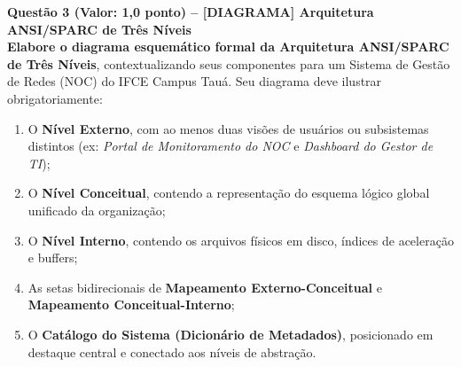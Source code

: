 \documentclass[11pt,a4paper]{article}
\begin{document}
\vspace{0.3cm}
\noindent\textbf{Questão 3 (Valor: 1,0 ponto) -- [DIAGRAMA] Arquitetura ANSI/SPARC de Três Níveis}\\[0.1cm]
\textbf{Elabore o diagrama esquemático formal da Arquitetura ANSI/SPARC de Três Níveis}, contextualizando seus componentes para um Sistema de Gestão de Redes (NOC) do IFCE Campus Tauá. Seu diagrama deve ilustrar obrigatoriamente:
\begin{enumerate}[label=\alph*),itemsep=1pt]
  \item O \textbf{Nível Externo}, com ao menos duas visões de usuários ou subsistemas distintos (ex: \textit{Portal de Monitoramento do NOC} e \textit{Dashboard do Gestor de TI});
  \item O \textbf{Nível Conceitual}, contendo a representação do esquema lógico global unificado da organização;
  \item O \textbf{Nível Interno}, contendo os arquivos físicos em disco, índices de aceleração e buffers;
  \item As setas bidirecionais de \textbf{Mapeamento Externo-Conceitual} e \textbf{Mapeamento Conceitual-Interno};
  \item O \textbf{Catálogo do Sistema (Dicionário de Metadados)}, posicionado em destaque central e conectado aos níveis de abstração.
\end{enumerate}
\end{document}
